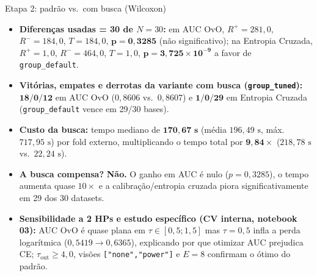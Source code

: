 \documentclass[aspectratio=169,11pt]{beamer}
\begin{document}
\begin{frame}{Etapa 2: padrão vs.\ com busca (Wilcoxon)}
    \small
    \begin{itemize}
        \setlength{\itemsep}{2pt}
        \item \textbf{Diferenças usadas = 30 de $N = 30$:} em AUC OvO, $R^+ = 281{,}0$, $R^- = 184{,}0$, $T = 184{,}0$, $\mathbf{p = 0{,}3285}$ (não significativo); na Entropia Cruzada, $R^+ = 1{,}0$, $R^- = 464{,}0$, $T = 1{,}0$, $\mathbf{p = 3{,}725 \times 10^{-9}}$ a favor de \texttt{group\_default}.
        \item \textbf{Vitórias, empates e derrotas da variante com busca (\texttt{group\_tuned}):} $\mathbf{18 / 0 / 12}$ em AUC OvO ($0{,}8606$ vs.\ $0{,}8607$) e $\mathbf{1 / 0 / 29}$ em Entropia Cruzada (\texttt{group\_default} vence em 29/30 bases).
        \item \textbf{Custo da busca:} tempo mediano de $\mathbf{170{,}67\text{ s}}$ (média $196{,}49\text{ s}$, máx.\ $717{,}95\text{ s}$) por fold externo, multiplicando o tempo total por $\mathbf{9{,}84\times}$ ($218{,}78\text{ s}$ vs.\ $22{,}24\text{ s}$).
        \item \textbf{A busca compensa?} \textbf{Não.} O ganho em AUC é nulo ($p = 0{,}3285$), o tempo aumenta quase $10\times$ e a calibração/entropia cruzada piora significativamente em 29 dos 30 datasets.
        \item \textbf{Sensibilidade a 2 HPs e estudo específico (CV interna, notebook 03):} AUC OvO é quase plana em $\tau \in [0{,}5; 1{,}5]$ mas $\tau = 0{,}5$ infla a perda logarítmica ($0{,}5419 \to 0{,}6365$), explicando por que otimizar AUC prejudica CE; $\tau_{\mathrm{out}} \ge 4{,}0$, visões \texttt{["none","power"]} e $E=8$ confirmam o ótimo do padrão.
    \end{itemize}
\end{frame}
\end{document}
